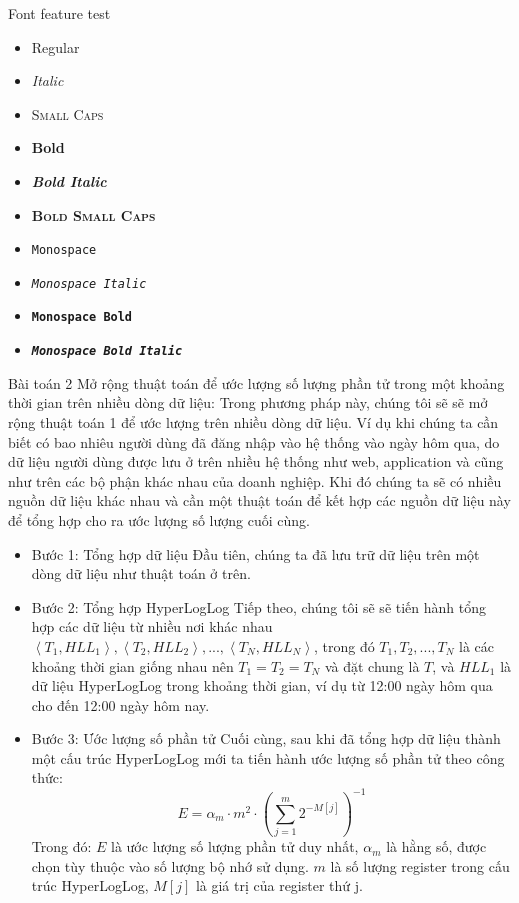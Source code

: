 \documentclass[10pt]{beamer}
\begin{document}
\begin{frame}{Font feature test}
  \begin{itemize}
    \item Regular
    \item \textit{Italic}
    \item \textsc{Small Caps}
    \item \textbf{Bold}
    \item \textbf{\textit{Bold Italic}}
    \item \textbf{\textsc{Bold Small Caps}}
    \item \texttt{Monospace}
    \item \texttt{\textit{Monospace Italic}}
    \item \texttt{\textbf{Monospace Bold}}
    \item \texttt{\textbf{\textit{Monospace Bold Italic}}}
  \end{itemize}
\end{frame}
\begin{frame}[fragile]{Bài toán 2}
  Mở rộng thuật toán để ước lượng số lượng phần tử trong một khoảng thời gian trên nhiều dòng dữ liệu:
  Trong phương pháp này, chúng tôi sẽ sẽ mở rộng thuật toán 1 để ước lượng trên nhiều dòng dữ liệu. Ví dụ khi chúng ta cần biết có bao nhiêu người dùng
  đã đăng nhập vào hệ thống vào ngày hôm qua, do dữ liệu người dùng được lưu ở trên nhiều hệ thống như web, application và cũng như trên các bộ phận khác nhau
  của doanh nghiệp. Khi đó chúng ta sẽ có nhiều nguồn dữ liệu khác nhau và cần một thuật toán để kết hợp các nguồn dữ liệu này để tổng hợp cho ra ước lượng
  số lượng cuối cùng.
  \begin{itemize}
      \item Bước 1: Tổng hợp dữ liệu
      Đầu tiên, chúng ta đã lưu trữ dữ liệu trên một dòng dữ liệu như thuật toán ở trên. 
      \item Bước 2: Tổng hợp HyperLogLog
      Tiếp theo, chúng tôi sẽ sẽ tiến hành tổng hợp các dữ liệu từ nhiều nơi khác nhau $\left< T_1, HLL_1\right>, \left< T_2, HLL_2\right>,...,\left< T_N, HLL_N\right>$, 
      trong đó $T_1, T_2,...,T_N$ là các khoảng thời gian giống nhau nên $T_1 = T_2 = T_N$ và đặt chung là $T$, và $HLL_1$ là dữ liệu HyperLogLog trong khoảng thời gian, ví dụ
      từ 12:00 ngày hôm qua cho đến 12:00 ngày hôm nay.  
      \item Bước 3: Ước lượng số phần tử
      Cuối cùng, sau khi đã tổng hợp dữ liệu thành một cấu trúc HyperLogLog mới ta tiến hành ước lượng số phần tử theo công thức:
      \[E = \alpha_m \cdot m^2 \cdot \left( \sum_{j=1}^{m} 2^{-M[j]} \right)^{-1}\]
      Trong đó: $E$ là ước lượng số lượng phần tử duy nhất, 
      $\alpha_m$ là hằng số, được chọn tùy thuộc vào số lượng bộ nhớ sử dụng.
      $m$ là số lượng register trong cấu trúc HyperLogLog, $M[j]$ là giá trị của register thứ j.
  
  \end{itemize}
\end{frame}
\end{document}

